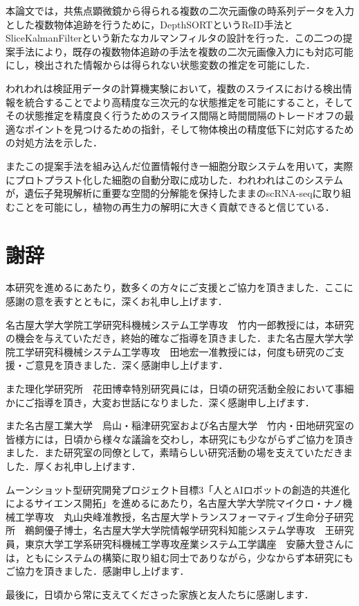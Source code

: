 \thispagestyle{fancy2}

本論文では，共焦点顕微鏡から得られる複数の二次元画像の時系列データを入力とした複数物体追跡を行うために，DepthSORTというReID手法とSliceKalmanFilterという新たなカルマンフィルタの設計を行った．この二つの提案手法により，既存の複数物体追跡の手法を複数の二次元画像入力にも対応可能にし，検出された情報からは得られない状態変数の推定を可能にした．

われわれは検証用データの計算機実験において，複数のスライスにおける検出情報を統合することでより高精度な三次元的な状態推定を可能にすること，そしてその状態推定を精度良く行うためのスライス間隔と時間間隔のトレードオフの最適なポイントを見つけるための指針，そして物体検出の精度低下に対応するための対処方法を示した．

またこの提案手法を組み込んだ位置情報付き一細胞分取システムを用いて，実際にプロトプラスト化した細胞の自動分取に成功した．われわれはこのシステムが，遺伝子発現解析に重要な空間的分解能を保持したままのscRNA-seqに取り組むことを可能にし，植物の再生力の解明に大きく貢献できると信じている．

\chapter*{謝辞}

本研究を進めるにあたり，数多くの方々にご支援とご協力を頂きました．ここに感謝の意を表すとともに，深くお礼申し上げます．

名古屋大学大学院工学研究科機械システム工学専攻　竹内一郎教授には，本研究の機会を与えていただき，終始的確なご指導を頂きました．また名古屋大学大学院工学研究科機械システム工学専攻　田地宏一准教授には，何度も研究のご支援・ご意見を頂きました．深く感謝申し上げます．

また理化学研究所　花田博幸特別研究員には，日頃の研究活動全般において事細かにご指導を頂き，大変お世話になりました．深く感謝申し上げます．

また名古屋工業大学　烏山・稲津研究室および名古屋大学　竹内・田地研究室の皆様方には，日頃から様々な議論を交わし，本研究にも少ながらずご協力を頂きました．また研究室の同僚として，素晴らしい研究活動の場を支えていただきました．厚くお礼申し上げます．

ムーンショット型研究開発プロジェクト目標3「人とAIロボットの創造的共進化によるサイエンス開拓」を進めるにあたり，名古屋大学大学院マイクロ・ナノ機械工学専攻　丸山央峰准教授，名古屋大学トランスフォーマティブ生命分子研究所　鵜飼優子博士，名古屋大学大学院情報学研究科知能システム学専攻　王研究員，東京大学工学系研究科機械工学専攻産業システム工学講座　安藤大登さんには，ともにシステムの構築に取り組む同士でありながら，少なからず本研究にもご協力を頂きました．感謝申し上げます．

最後に，日頃から常に支えてくださった家族と友人たちに感謝します．
